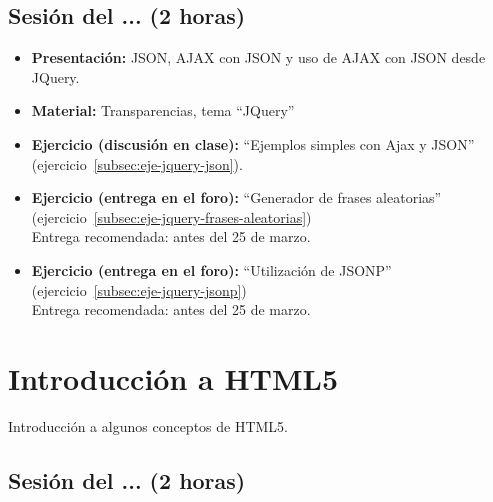\documentclass[a4paper,12pt]{report}
\begin{document}
\subsection{Sesión del ... (2 horas)}

\begin{itemize}
\item \textbf{Presentación:} JSON, AJAX con JSON y uso de AJAX con JSON desde JQuery.
\item \textbf{Material:} Transparencias, tema ``JQuery''
\item \textbf{Ejercicio (discusión en clase):} ``Ejemplos simples con Ajax y JSON'' (ejercicio~\ref{subsec:eje-jquery-json}).
\item \textbf{Ejercicio (entrega en el foro):} ``Generador de frases aleatorias'' (ejercicio~\ref{subsec:eje-jquery-frases-aleatorias}) \\
  Entrega recomendada: antes del 25 de marzo.
\item \textbf{Ejercicio (entrega en el foro):} ``Utilización de JSONP'' (ejercicio~\ref{subsec:eje-jquery-jsonp}) \\
  Entrega recomendada: antes del 25 de marzo.
\end{itemize}


\section{Introducción a HTML5}

Introducción a algunos conceptos de HTML5.

\subsection{Sesión del ... (2 horas)}
\end{document}

